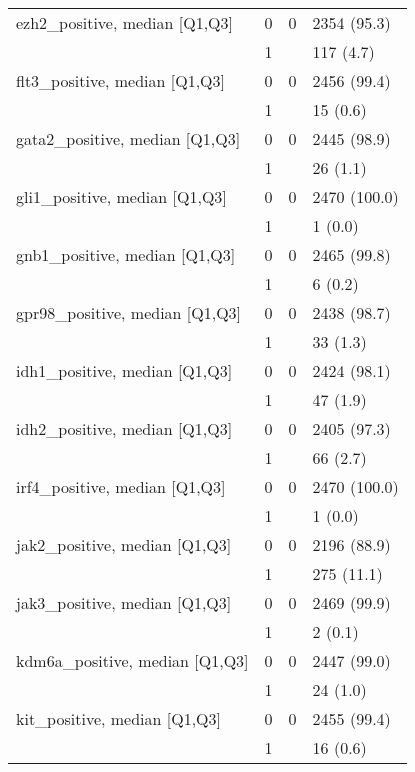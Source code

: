 \begin{tabular}{llll}
ezh2\_positive, median [Q1,Q3] & 0 &      0 &       2354 (95.3) \\
                 & 1 &        &         117 (4.7) \\
flt3\_positive, median [Q1,Q3] & 0 &      0 &       2456 (99.4) \\
                 & 1 &        &          15 (0.6) \\
gata2\_positive, median [Q1,Q3] & 0 &      0 &       2445 (98.9) \\
                 & 1 &        &          26 (1.1) \\
gli1\_positive, median [Q1,Q3] & 0 &      0 &      2470 (100.0) \\
                 & 1 &        &           1 (0.0) \\
gnb1\_positive, median [Q1,Q3] & 0 &      0 &       2465 (99.8) \\
                 & 1 &        &           6 (0.2) \\
gpr98\_positive, median [Q1,Q3] & 0 &      0 &       2438 (98.7) \\
                 & 1 &        &          33 (1.3) \\
idh1\_positive, median [Q1,Q3] & 0 &      0 &       2424 (98.1) \\
                 & 1 &        &          47 (1.9) \\
idh2\_positive, median [Q1,Q3] & 0 &      0 &       2405 (97.3) \\
                 & 1 &        &          66 (2.7) \\
irf4\_positive, median [Q1,Q3] & 0 &      0 &      2470 (100.0) \\
                 & 1 &        &           1 (0.0) \\
jak2\_positive, median [Q1,Q3] & 0 &      0 &       2196 (88.9) \\
                 & 1 &        &        275 (11.1) \\
jak3\_positive, median [Q1,Q3] & 0 &      0 &       2469 (99.9) \\
                 & 1 &        &           2 (0.1) \\
kdm6a\_positive, median [Q1,Q3] & 0 &      0 &       2447 (99.0) \\
                 & 1 &        &          24 (1.0) \\
kit\_positive, median [Q1,Q3] & 0 &      0 &       2455 (99.4) \\
                 & 1 &        &          16 (0.6) \\

\end{tabular}
